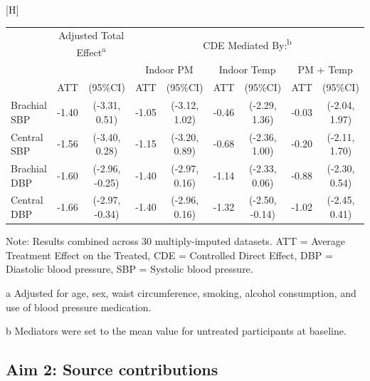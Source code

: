 \documentclass[
  letterpaper,
  DIV=11,
  numbers=noendperiod]{scrartcl}
\makeatletter
\renewenvironment{table}%
  {\renewcommand\familydefault\sfdefault
   \@float{table}}
  {\end@float}
\makeatother
\begin{document}
\hypertarget{tbl-bp-med}{}
\begin{table}[H]
\caption{\label{tbl-bp-med}Controlled direct effects for the CBHP policy }\tabularnewline

\centering\begingroup\fontsize{10}{12}\selectfont

\begin{threeparttable}
\begin{tabular}{lcccccclc}
\toprule
\multicolumn{1}{c}{ } & \multicolumn{2}{c}{Adjusted Total Effect\textsuperscript{a}} & \multicolumn{6}{c}{CDE Mediated By:\textsuperscript{b}} \\
\cmidrule(l{3pt}r{3pt}){2-3} \cmidrule(l{3pt}r{3pt}){4-9}
\multicolumn{3}{c}{ } & \multicolumn{2}{c}{Indoor PM} & \multicolumn{2}{c}{Indoor Temp} & \multicolumn{2}{c}{PM + Temp} \\
\cmidrule(l{3pt}r{3pt}){4-5} \cmidrule(l{3pt}r{3pt}){6-7} \cmidrule(l{3pt}r{3pt}){8-9}
 & ATT & (95\%CI) & ATT & (95\%CI) & ATT & (95\%CI) & ATT & (95\%CI)\\
\midrule
Brachial SBP & -1.40 & (-3.31, 0.51) & -1.05 & (-3.12, 1.02) & -0.46 & (-2.29, 1.36) & -0.03 & (-2.04, 1.97)\\
Central SBP & -1.56 & (-3.40, 0.28) & -1.15 & (-3.20, 0.89) & -0.68 & (-2.36, 1.00) & -0.20 & (-2.11, 1.70)\\
Brachial DBP & -1.60 & (-2.96, -0.25) & -1.40 & (-2.97, 0.16) & -1.14 & (-2.33, 0.06) & -0.88 & (-2.30, 0.54)\\
Central DBP & -1.66 & (-2.97, -0.34) & -1.40 & (-2.96, 0.16) & -1.32 & (-2.50, -0.14) & -1.02 & (-2.45, 0.41)\\
\bottomrule
\end{tabular}
\begin{tablenotes}
\item \small{Note: Results combined across 30 multiply-imputed datasets. ATT = Average Treatment Effect on the Treated, CDE = Controlled Direct Effect, DBP = Diastolic blood pressure, SBP = Systolic blood pressure.}
\item[a] \small{Adjusted for age, sex, waist circumference, smoking, alcohol consumption, and use of blood pressure medication.}
\item[b] \small{Mediators were set to the mean value for untreated participants at baseline.}
\end{tablenotes}
\end{threeparttable}
\endgroup{}
\end{table}

\hypertarget{aim-2-source-contributions}{%
\subsection{Aim 2: Source
contributions}\label{aim-2-source-contributions}}
\end{document}
